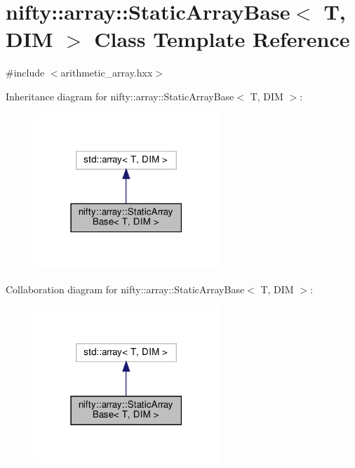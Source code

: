 \hypertarget{classnifty_1_1array_1_1StaticArrayBase}{}\section{nifty\+:\+:array\+:\+:Static\+Array\+Base$<$ T, D\+IM $>$ Class Template Reference}
\label{classnifty_1_1array_1_1StaticArrayBase}


{\ttfamily \#include $<$arithmetic\+\_\+array.\+hxx$>$}



Inheritance diagram for nifty\+:\+:array\+:\+:Static\+Array\+Base$<$ T, D\+IM $>$\+:
\nopagebreak
\begin{figure}[H]
\begin{center}
\leavevmode
\includegraphics[width=198pt]{classnifty_1_1array_1_1StaticArrayBase__inherit__graph}
\end{center}
\end{figure}


Collaboration diagram for nifty\+:\+:array\+:\+:Static\+Array\+Base$<$ T, D\+IM $>$\+:
\nopagebreak
\begin{figure}[H]
\begin{center}
\leavevmode
\includegraphics[width=198pt]{classnifty_1_1array_1_1StaticArrayBase__coll__graph}
\end{center}
\end{figure}
